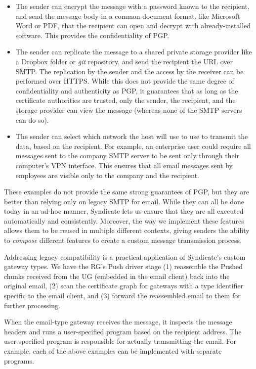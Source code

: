 \begin{itemize}
\item The sender can encrypt the message with a password known to the recipient,
and send the message body in a common document format, like Microsoft Word or
PDF, that the recipient can open and decrypt with already-installed software.
This provides the confidentiality of PGP.
\item The sender can replicate the message to a shared private storage provider
like a Dropbox folder or \textit{git} repository, and send the
recipient the URL over SMTP.  The replication by the sender and the access by
the receiver can be performed over HTTPS.  While this does not provide the same
degree of confidentiality and authenticity as PGP, it guarantees that as long as
the certificate authorities are trusted, only the sender, the recipient, and the
storage provider can view the message (whereas none of the SMTP servers can do
so).
\item The sender can select which network the host will use to use to transmit the data, based on
the recipient.  For example, an enterprise user could require all messages sent
to the company SMTP server to be sent only through their computer's
VPN interface.  This ensures that all email messages sent by employees are
visible only to the company and the recipient.
\end{itemize}

These examples do not provide the same strong guarantees of PGP, but they are
better than relying only on legacy SMTP for email.  While they can all be done
today in an ad-hoc manner, Syndicate lets us ensure that they are all executed
automatically and consistently.  Moreover, the way we implement these features
allows them to be reused in multiple different contexts, giving senders the
ability to \emph{compose} different features to create a custom message
transmission process.


Addressing legacy compatibility is a practical application of Syndicate's custom
gateway types.  We have the RG's
Push driver stage (1) reassemble the Pushed chunks received from the UG
(embedded in the email client) back into the original email, (2)
scan the certificate graph for gateways with a type identifier specific to the
email client, and (3) forward the reassembled email to them for further
processing.

When the email-type gateway receives the message, it inspects the message
headers and runs a user-specified program based on the recipient address.  The
user-specified program is responsible for actually transmitting the email.
For example, each of the above examples can be implemented with separate
programs.

